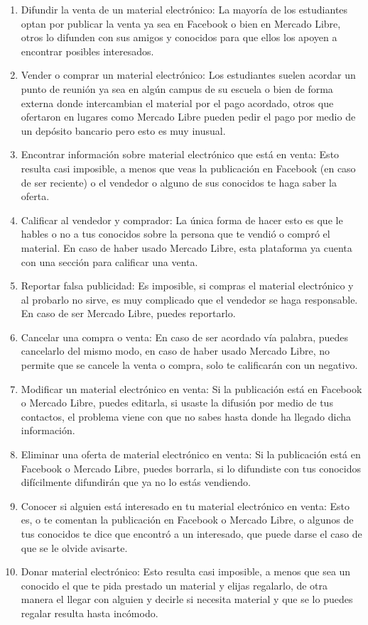 \begin{enumerate}
	\item Difundir la venta de un material electrónico: La mayoría de los estudiantes optan por publicar la venta ya sea en Facebook o bien en Mercado Libre, otros lo difunden con sus amigos y conocidos para que ellos los apoyen a encontrar posibles interesados.
	\item Vender o comprar un material electrónico: Los estudiantes suelen acordar un punto de reunión ya sea en algún campus de su escuela o bien de forma externa donde intercambian el material por el pago acordado, otros que ofertaron en lugares como Mercado Libre pueden pedir el pago por medio de un depósito bancario pero esto es muy inusual.
	\item Encontrar información sobre material electrónico que está en venta: Esto resulta casi imposible, a menos que veas la publicación en Facebook (en caso de ser reciente) o el vendedor o alguno de sus conocidos te haga saber la oferta.
	\item Calificar al vendedor y comprador: La única forma de hacer esto es que le hables o no a tus conocidos sobre la persona que te vendió o compró el material. En caso de haber usado Mercado Libre, esta plataforma ya cuenta con una sección para calificar una venta.
	\item Reportar falsa publicidad: Es imposible, si compras el material electrónico y al probarlo no sirve, es muy complicado que el vendedor se haga responsable. En caso de ser Mercado Libre, puedes reportarlo.
	\item Cancelar una compra o venta: En caso de ser acordado vía palabra, puedes cancelarlo del mismo modo, en caso de haber usado Mercado Libre, no permite que se cancele la venta o compra, solo te calificarán con un negativo.
	\item Modificar un material electrónico en venta: Si la publicación está en Facebook o Mercado Libre, puedes editarla, si usaste la difusión por medio de tus contactos, el problema viene con que no sabes hasta donde ha llegado dicha información.
	\item Eliminar una oferta de material electrónico en venta: Si la publicación está en Facebook o Mercado Libre, puedes borrarla, si lo difundiste con tus conocidos difícilmente difundirán que ya no lo estás vendiendo.

	\item Conocer si alguien está interesado en tu material electrónico en venta: Esto es, o te comentan la publicación en Facebook o Mercado Libre, o algunos de tus conocidos te dice que encontró a un interesado, que puede darse el caso de que se le olvide avisarte.
	\item Donar material electrónico: Esto resulta casi imposible, a menos que sea un conocido el que te pida prestado un material y elijas regalarlo, de otra manera el llegar con alguien y decirle si necesita material y que se lo puedes regalar resulta hasta incómodo.
\end{enumerate}

